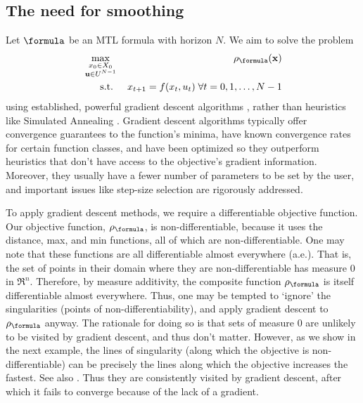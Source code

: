 \subsection{The need for smoothing}
\label{sec:need for smoothing}
Let $\formula$ be an MTL formula with horizon $N$.
We aim to solve the problem
\begin{eqnarray}
\label{eq:min rob problem}
\max_{\begin{smallmatrix}
	x_0 \in X_0 \\
	\inpSig \in \inpSet^{N-1}
	\end{smallmatrix}} && \robf(\sstraj)
\nonumber
\\
\text{s.t. } && x_{t+1} = f(x_t,u_t) \; \forall t=0,1,\ldots,N-1
\end{eqnarray}
using established, powerful gradient descent algorithms \cite{Polak97_Optim}, rather than heuristics like Simulated Annealing \cite{kirkpatrickV_SA83}.
Gradient descent algorithms typically offer convergence guarantees to the function's minima, have known convergence rates for certain function classes, and have been optimized so they outperform heuristics that don't have access to the objective's gradient information.
Moreover, they usually have a fewer number of parameters to be set by the user, and important issues like step-size selection are rigorously addressed.

To apply gradient descent methods, we require a differentiable objective function. 
Our objective function, $\robf$, is non-differentiable, because it uses the distance, max, and min functions, all of which are non-differentiable.
One may note that these functions are all differentiable almost everywhere (a.e.).
That is, the set of points in their domain where they are non-differentiable has measure 0 in $\Re^n$. 
Therefore, by measure additivity, the composite function $\robf$ is itself differentiable almost everywhere.
Thus, one may be tempted to `ignore' the singularities (points of non-differentiability), and apply gradient descent to $\robf$ anyway.
The rationale for doing so is that sets of measure 0 are unlikely to be visited by gradient descent, and thus don't matter. 
However, as we show in the next example, the lines of singularity (along which the objective is non-differentiable) can be  precisely the lines along which the objective increases the fastest.
See also \cite{Cortes08_Discontinuous}.
Thus they are consistently visited by gradient descent, after which it fails to converge because of the lack of a gradient.


